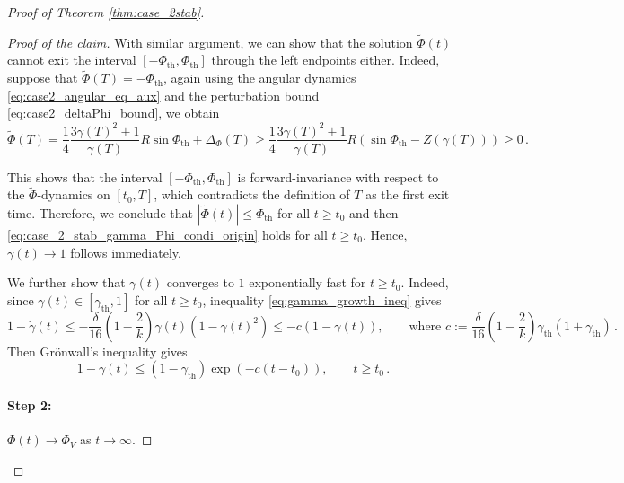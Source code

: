 \documentclass[10pt]{article}
\theoremstyle{definition}
\theoremstyle{definition}
\numberwithin{equation}{section}
\newcommand{\Dgamma}{\Dot{\gamma}}
\newcommand{\gammaTH}{\gamma_{\mathrm{th}}}
\newcommand{\DeltaPhi}{\Delta_{\Phi}}
\newcommand{\PhiV}{\Phi_{V}}
\newcommand{\WPhi}{\widetilde{\Phi}}
\newcommand{\PhiTH}{\Phi_{\mathrm{th}}}
\begin{document}
\begin{proof}[Proof of Theorem \ref{thm:case_2stab}]
\begin{proof}[Proof of the claim]
With similar argument, we can show that the solution $\WPhi(t)$ cannot exit the interval $[-\PhiTH, \PhiTH]$ through the left endpoints either.
Indeed, suppose that $\WPhi(T) = -\PhiTH$, again using the angular dynamics \eqref{eq:case2_angular_eq_aux} and the perturbation bound \eqref{eq:case2_deltaPhi_bound}, we obtain
\begin{equation*}
\Dot{\WPhi}(T) = \frac{1}{4} \frac{3\gamma(T)^2 + 1}{\gamma(T)} R \sin \PhiTH + \DeltaPhi(T) \geq \frac{1}{4} \frac{3\gamma(T)^2 + 1}{\gamma(T)} R \left( \sin \PhiTH - Z (\gamma(T)) \right) \geq 0 \, .
\end{equation*}

This shows that the interval $[-\PhiTH, \PhiTH]$ is forward-invariance with respect to the $\WPhi$-dynamics on $[t_0, T]$, which contradicts the definition of $T$ as the first exit time.
Therefore, we conclude that $|\WPhi(t)| \leq \PhiTH$ for all $t \geq t_0$ and then \eqref{eq:case_2_stab_gamma_Phi_condi_origin} holds for all $t \geq t_0$.
Hence, $\gamma(t) \rightarrow 1$ follows immediately.

We further show that $\gamma(t)$ converges to $1$ exponentially fast for $t \geq t_0$.
Indeed, since $\gamma(t) \in [\gammaTH,1]$ for all $t \geq t_0$, inequality \eqref{eq:gamma_growth_ineq} gives
\begin{equation*}
1 - \Dgamma (t) \leq -\frac{\delta}{16} \left( 1 - \frac{2}{k} \right) \gamma(t) \left( 1 - \gamma(t)^2 \right) \leq -c \left( 1 - \gamma(t) \right), \qquad \text{where } c := \frac{\delta}{16} \left( 1 - \frac{2}{k} \right) \gammaTH (1 + \gammaTH) \, .
\end{equation*}
Then Grönwall's inequality gives
\begin{equation}\label{eq:case2_stab_gamma_exp_conv}
    1 - \gamma(t) \leq (1 - \gammaTH) \exp \left( - c (t - t_0) \right), \qquad t \geq t_0 \, .
\end{equation}

\paragraph{Step 2:} $\Phi(t) \rightarrow \PhiV$ as $t \rightarrow \infty$.


\end{proof}
\end{proof}
\end{document}

